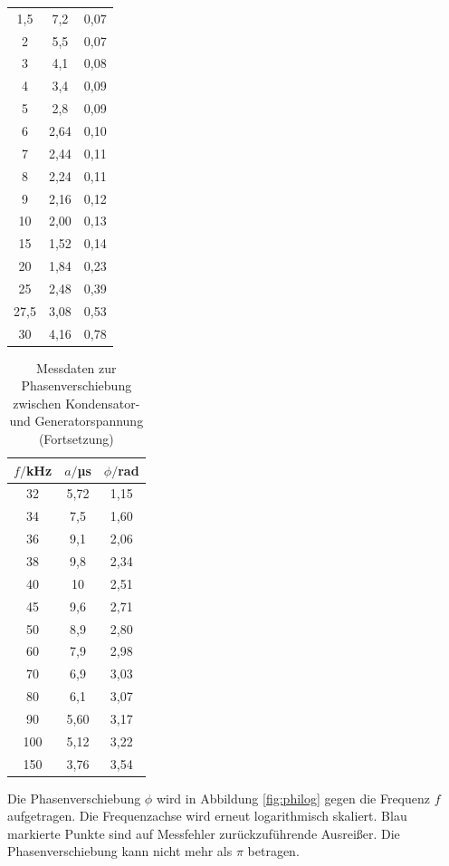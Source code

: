 \begin{table}
\begin{tabular}{c c c}
 1,5   &    7,2  & 0,07 \\
 2	   &    5,5  & 0,07 \\
 3	   &    4,1  & 0,08 \\
 4	   &    3,4  & 0,09 \\
 5	   &    2,8  & 0,09 \\
 6	   &    2,64 & 0,10 \\
 7	   &    2,44 & 0,11 \\
 8	   &    2,24 & 0,11 \\
 9	   &    2,16 & 0,12 \\
10	   &    2,00 & 0,13 \\
15	   &    1,52 & 0,14 \\
20	   &    1,84 & 0,23 \\
25	   &    2,48 & 0,39 \\
27,5   &    3,08 & 0,53 \\
30	   &    4,16 & 0,78 \\
\bottomrule
\end{tabular}
\end{table}

\begin{table}
\centering
\caption{Messdaten zur Phasenverschiebung zwischen Kondensator- und Generatorspannung (Fortsetzung)}
\label{tab:phase2}
\begin{tabular}{c c c}
\toprule
$f/$kHz & $a/$µs & $\phi/$rad \\
\midrule
32	& 5,72 & 1,15 \\
34	& 7,5  & 1,60 \\
36	& 9,1  & 2,06 \\
38	& 9,8  & 2,34 \\
40	& 10   & 2,51 \\
45	& 9,6  & 2,71 \\
50	& 8,9  & 2,80 \\
60	& 7,9  & 2,98 \\
70	& 6,9  & 3,03 \\
80	& 6,1  & 3,07 \\
90	& 5,60 & 3,17 \\
100 & 5,12 & 3,22 \\
150 & 3,76 & 3,54 \\
\bottomrule
\end{tabular}
\end{table}

Die Phasenverschiebung $\phi$ wird in Abbildung \ref{fig:philog} gegen die Frequenz
$f$ aufgetragen. Die Frequenzachse wird erneut logarithmisch skaliert. Blau markierte
Punkte sind auf Messfehler zurückzuführende Ausreißer. Die Phasenverschiebung kann
nicht mehr als $\pi$ betragen.

